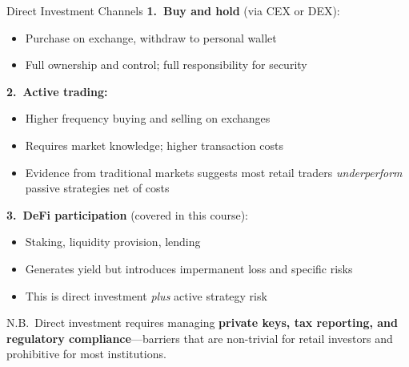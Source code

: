 \documentclass[10pt]{beamer}
\begin{document}
\begin{frame}{Direct Investment Channels}
  \textbf{1.\ Buy and hold} (via CEX or DEX):
  \begin{itemize}
    \item Purchase on exchange, withdraw to personal wallet
    \item Full ownership and control; full responsibility for security
  \end{itemize}
  
  \vspace{0.3em}
  \textbf{2.\ Active trading:}
  \begin{itemize}
    \item Higher frequency buying and selling on exchanges
    \item Requires market knowledge; higher transaction costs
    \item Evidence from traditional markets suggests most retail traders \textit{underperform} passive strategies net of costs
  \end{itemize}
  
  \vspace{0.3em}
  \textbf{3.\ DeFi participation} (covered in this course):
  \begin{itemize}
    \item Staking, liquidity provision, lending
    \item Generates yield but introduces impermanent loss and specific risks
    \item This is direct investment \textit{plus} active strategy risk
  \end{itemize}
  
  \vspace{0.3em}
  N.B.\ Direct investment requires managing \textbf{private keys, tax reporting, and regulatory compliance}---barriers that are non-trivial for retail investors and prohibitive for most institutions.
\end{frame}
\end{document}
